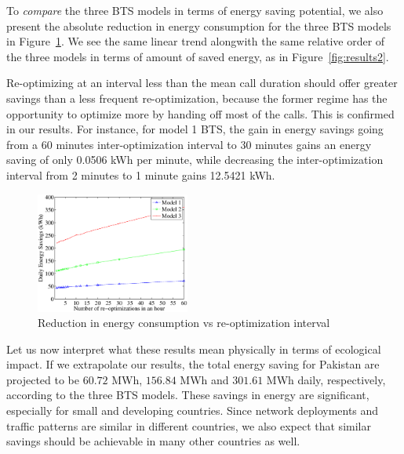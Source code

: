 
To \textit{compare} the three BTS models in terms of energy saving potential, we also present the absolute reduction in energy consumption for the three BTS models in Figure~\ref{fig:results4}. We see the same linear trend alongwith the same relative order of the three models in terms of amount of saved energy, as in Figure~\ref{fig:results2}. 

Re-optimizing at an interval less than the mean call duration should offer greater savings than a less frequent re-optimization, because the former regime has the opportunity to optimize more by handing off most of the calls. This is confirmed in our results. For instance, for model 1 BTS, the gain in energy savings going from a 60 minutes inter-optimization interval to 30 minutes gains an energy saving of only 0.0506 kWh per minute, while decreasing the inter-optimization interval from 2 minutes to 1 minute gains 12.5421 kWh. %

\begin{figure}
\includegraphics[width=0.45\textwidth]{figures/e.savings.powersaving.eps}
\caption{Reduction in energy consumption vs re-optimization interval}
\label{fig:results4}
\end{figure}

Let us now interpret what these results mean physically in terms of ecological impact. If we extrapolate our results, the total energy saving for Pakistan are projected to be $60.72$ MWh, $156.84$ MWh and $301.61$ MWh daily, respectively, according to the three BTS models. These savings in energy are significant, especially for small and developing countries. Since network deployments and traffic patterns are similar in different countries, we also expect that similar savings should be achievable in many other countries as well.

